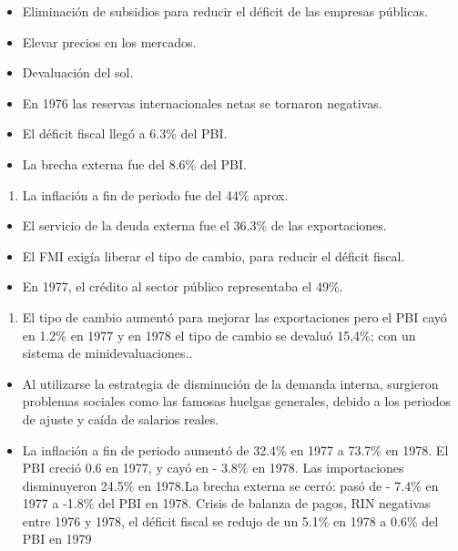 \documentclass[
  letterpaper,
  DIV=11,
  numbers=noendperiod]{scrartcl}
\providecommand{\tightlist}{%
  \setlength{\itemsep}{0pt}\setlength{\parskip}{0pt}}\usepackage{longtable,booktabs,array}
\begin{document}
\begin{itemize}
\tightlist
\item
  Eliminación de subsidios para reducir el déficit de las empresas
  públicas.
\item
  Elevar precios en los mercados.
\item
  Devaluación del sol.
\item
  En 1976 las reservas internacionales netas se tornaron negativas.
\item
  El déficit fiscal llegó a 6.3\% del PBI.
\item
  La brecha externa fue del 8.6\% del PBI.
\end{itemize}

\begin{enumerate}
\def\labelenumi{\arabic{enumi}.}
\setcounter{enumi}{3}
\tightlist
\item
  La inflación a fin de periodo fue del 44\% aprox.
\end{enumerate}

\begin{itemize}
\tightlist
\item
  El servicio de la deuda externa fue el 36.3\% de las exportaciones.
\item
  El FMI exigía liberar el tipo de cambio, para reducir el déficit
  fiscal.
\item
  En 1977, el crédito al sector público representaba el 49\%.
\end{itemize}

\begin{enumerate}
\def\labelenumi{\arabic{enumi}.}
\setcounter{enumi}{4}
\tightlist
\item
  El tipo de cambio aumentó para mejorar las exportaciones pero el PBI
  cayó en 1.2\% en 1977 y en 1978 el tipo de cambio se devaluó 15,4\%;
  con un sistema de minidevaluaciones..
\end{enumerate}

\begin{itemize}
\tightlist
\item
  Al utilizarse la estrategia de disminución de la demanda interna,
  surgieron problemas sociales como las famosas huelgas generales,
  debido a los periodos de ajuste y caída de salarios reales.
\item
  La inflación a fin de periodo aumentó de 32.4\% en 1977 a 73.7\% en
  1978. El PBI creció 0.6 en 1977, y cayó en - 3.8\% en 1978. Las
  importaciones disminuyeron 24.5\% en 1978.La brecha externa se cerró:
  pasó de - 7.4\% en 1977 a -1.8\% del PBI en 1978. Crisis de balanza de
  pagos, RIN negativas entre 1976 y 1978, el déficit fiscal se redujo de
  un 5.1\% en 1978 a 0.6\% del PBI en 1979
\end{itemize}
\end{document}
